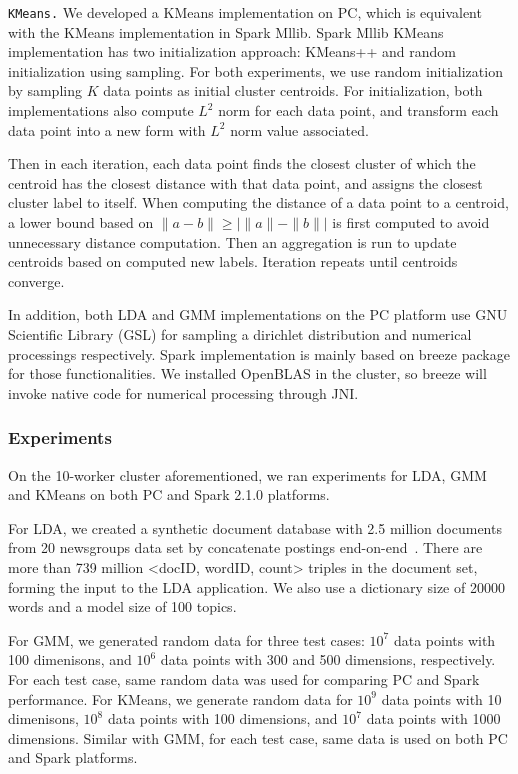 \vspace{5pt}
\noindent
\texttt {KMeans.} We developed a KMeans implementation on PC, which
is equivalent with the KMeans implementation in Spark Mllib. Spark
Mllib KMeans implementation has two initialization approach: KMeans++
and random initialization using sampling. For both experiments, we use
random initialization by sampling $K$ data points as initial
cluster centroids. For initialization, both implementations also compute $L^2$ norm for each data
point, and transform each data point into a new form with $L^2$ norm value
associated. 

Then in each iteration, each data point finds the closest cluster
of which the centroid has the closest distance with that data point, and assigns the closest
cluster label to itself. When computing the distance of a data point to a
centroid, a lower bound based on $\|a - b\| \geq |\|a\| - \|b\||$ is
first computed to avoid unnecessary distance computation. Then an aggregation is run to update centroids
based on computed new labels. Iteration repeats until centroids
converge.

\vspace{5pt}
In addition, both LDA and GMM implementations on the PC platform 
use GNU Scientific Library (GSL) for sampling a dirichlet
distribution and numerical
processings respectively. Spark implementation is mainly based on
breeze package for those functionalities. We installed OpenBLAS in the
cluster, so breeze will invoke native code for numerical processing
through JNI. 


\subsubsection {Experiments}

On the 10-worker cluster aforementioned, we ran experiments for LDA,
GMM and KMeans on both PC and Spark 2.1.0 platforms. 

For LDA,  we
created a synthetic document database with 2.5 million documents from
20 newsgroups data set by concatenate postings
end-on-end~\cite{jermaineExperimental}. There are more than 739
million <docID, wordID, count> triples in the document set, forming
the input to the LDA application. We also use a dictionary size
of 20000 words and a model size of 100 topics. 

For GMM, we generated
random data for three test cases: $10^7$ data
points with 100 dimenisons, and $10^6$ data points with 300 and 500
dimensions, respectively. For each test case, same random data was used
for comparing PC and Spark performance. For KMeans, we
generate random data for $10^9$ data
points with 10 dimenisons, $10^8$ data points with 100 dimensions,  and $10^7$
data points with 1000
dimensions. Similar with GMM, for each test case, same data is used on both PC and
Spark platforms.

